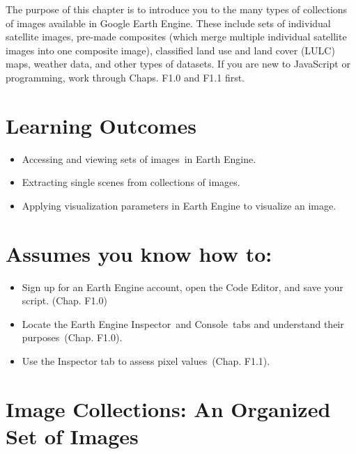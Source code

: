 \documentclass[
  letterpaper,
  DIV=11,
  numbers=noendperiod]{scrreprt}
\providecommand{\tightlist}{%
  \setlength{\itemsep}{0pt}\setlength{\parskip}{0pt}}\usepackage{longtable,booktabs,array}
\begin{document}

The purpose of this chapter is to introduce you to the many types of
collections of images available in Google Earth Engine. These include
sets of individual satellite images, pre-made composites (which merge
multiple individual satellite images into one composite image),
classified land use and land cover (LULC) maps, weather data, and other
types of datasets. If you are new to JavaScript or programming, work
through Chaps. F1.0 and F1.1 first. ~

\hypertarget{learning-outcomes-2}{%
\section*{Learning Outcomes}\label{learning-outcomes-2}}


\begin{itemize}
\tightlist
\item
  Accessing and viewing sets of images~in Earth Engine.
\item
  Extracting single scenes from collections of images.
\item
  Applying visualization parameters in Earth Engine to visualize an
  image.
\end{itemize}

\hypertarget{assumes-you-know-how-to-2}{%
\section*{Assumes you know how to:}\label{assumes-you-know-how-to-2}}


\begin{itemize}
\tightlist
\item
  Sign up for an Earth Engine account, open the Code Editor, and save
  your script. (Chap. F1.0)
\item
  Locate the Earth Engine Inspector~and Console~tabs and understand
  their purposes~(Chap. F1.0).
\item
  Use the Inspector tab to assess pixel values~(Chap. F1.1).
\end{itemize}

\hypertarget{image-collections-an-organized-set-of-images}{%
\section{Image Collections: An Organized Set of
Images}\label{image-collections-an-organized-set-of-images}}
\end{document}
